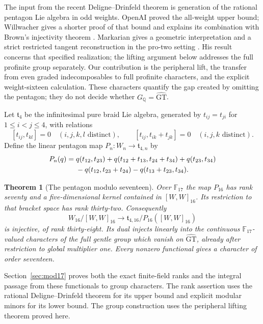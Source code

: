 \documentclass[11pt]{article}
\newcommand{\GT}{\widehat{\mathrm{GT}}}
\newcommand{\F}{\mathbb F}
\newcommand{\Q}{\mathbb Q}
\newtheorem{theorem}{Theorem}[section]
\theoremstyle{definition}
\theoremstyle{remark}
\begin{document}
The input from the recent Deligne--Drinfeld theorem is generation of the
rational pentagon Lie algebra in odd weights.  OpenAI proved the all-weight
upper bound; Willwacher gives a shorter proof of that bound and explains
its combination with Brown's injectivity theorem
\cite[Theorem 1.1 and (7), pp.~1--2]{Willwacher}.
Markarian gives a geometric interpretation and a strict restricted tangent
reconstruction in the pro-two setting \cite[Theorem 4.8 and \S5]{Markarian}.
His result concerns that specified realization; the lifting argument below
addresses the full profinite group separately.
Our contribution is the peripheral lift, the transfer from even graded
indecomposables to full profinite characters, and the explicit weight-sixteen
calculation.  These characters quantify the gap created by omitting the
pentagon; they do not decide whether $G_{\Q}=\GT$.

Let $\mathfrak t_4$ be the infinitesimal pure braid Lie algebra, generated
by $t_{ij}=t_{ji}$ for $1\leq i<j\leq4$, with relations
\[
 [t_{ij},t_{kl}]=0\quad(i,j,k,l\text{ distinct}),\qquad
 [t_{ij},t_{ik}+t_{jk}]=0\quad(i,j,k\text{ distinct}).
\]
Define the linear pentagon map $P_n:W_n\to\mathfrak t_{4,n}$ by
\begin{align}
P_n(q)={}&q(t_{12},t_{23})+
q(t_{12}+t_{13},t_{24}+t_{34})+q(t_{23},t_{34})\notag\\
&-q(t_{12},t_{23}+t_{24})-q(t_{13}+t_{23},t_{34}).\label{eq:pentagon}
\end{align}

\begin{theorem}[The pentagon modulo seventeen]\label{thm:main-pentagon17}
Over $\F_{17}$ the map $P_{16}$ has rank seventy and a
five-dimensional kernel contained in $[W,W]_{16}$. Its restriction
to that bracket space has rank thirty-two. Consequently
\[
 W_{16}/[W,W]_{16}\longrightarrow
 \mathfrak t_{4,16}/P_{16}([W,W]_{16})
\]
is injective, of rank thirty-eight. Its dual injects linearly into
the continuous $\F_{17}$-valued characters of the full gentle group
which vanish on $\GT$, already after restriction to global
multiplier one. Every nonzero functional gives a character of order
seventeen.
\end{theorem}

Section~\ref{sec:mod17} proves both the exact finite-field ranks and
the integral passage from these functionals to group characters.
The rank assertion uses the rational Deligne--Drinfeld theorem for
its upper bound and explicit modular minors for its lower bound.
The group construction uses the peripheral lifting theorem proved here.
\end{document}
